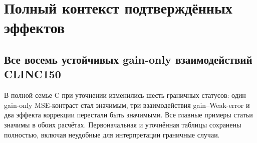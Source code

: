 \section{Полный контекст подтверждённых эффектов}
\subsection{Все восемь устойчивых gain-only взаимодействий CLINC150}
\begin{table}[htbp]\centering\small
\caption{Все взаимодействия gain-методов, обнаруженные при
accuracy-настройке в исходной семье C и сохранённые после 10\,000
повторов. Ориентация выбрана так, чтобы изменение разности было
положительным. Строки зависимы и относятся к трём парам экспертов.}
\label{tab:all_eight}

\end{table}

\begin{table}[htbp]\centering\footnotesize
\caption{Численная устойчивость основных CLINC-контрастов.
Первые интервалы --- исходный расчёт 2\,000 повторов,
вторые --- однократное уточнение до 10\,000; p-values относятся
к уточнённому расчёту. Семья из 1\,698 контрастов одинакова.}
\label{tab:mc_audit}

\end{table}

В полной семье C при уточнении изменились шесть граничных статусов:
один gain-only MSE-контраст стал значимым, три взаимодействия
gain--Weak-error и два эффекта коррекции перестали быть значимыми.
Все главные примеры статьи значимы в обоих расчётах.
Первоначальная и уточнённая таблицы сохранены полностью, включая
неудобные для интерпретации граничные случаи.

